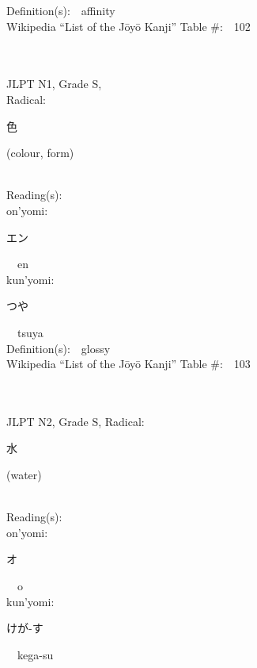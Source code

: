 \begin{multicols}{2}
Definition(s):\ \ affinity \\
Wikipedia ``List of the J\=oy\=o Kanji'' Table \#:\ \ 102 \\
\ \ \\
{\fontsize{34pt}{40pt}  }\ \ \\
{JLPT N1, Grade S, \\Radical:\ \ {\begin{CJK}{UTF8}{min} 色 \end{CJK}} (colour, form) } \\
Reading(s):\ \ \\
{\hspace*{1em}}on'yomi:\ \ \\
{\hspace*{2em}}{\begin{CJK}{UTF8}{min} エン \end{CJK}}\ \ en\ \ \\
{\hspace*{1em}}kun'yomi:\ \ \\
{\hspace*{2em}}{\begin{CJK}{UTF8}{min} つや \end{CJK}}\ \ tsuya\ \ \\
Definition(s):\ \ glossy \\
Wikipedia ``List of the J\=oy\=o Kanji'' Table \#:\ \ 103 \\
\ \ \\
{\fontsize{34pt}{40pt}  }\ \ \\  %
{JLPT N2, Grade S, Radical:\ \ {\begin{CJK}{UTF8}{min} 水 \end{CJK}} (water) } \\
Reading(s):\ \ \\
{\hspace*{1em}}on'yomi:\ \ \\
{\hspace*{2em}}{\begin{CJK}{UTF8}{min} オ \end{CJK}}\ \ o\ \ \\
{\hspace*{1em}}kun'yomi:\ \ \\
{\hspace*{2em}}{\begin{CJK}{UTF8}{min} けが-す \end{CJK}}\ \ kega-su\ \ \\

\end{multicols}
